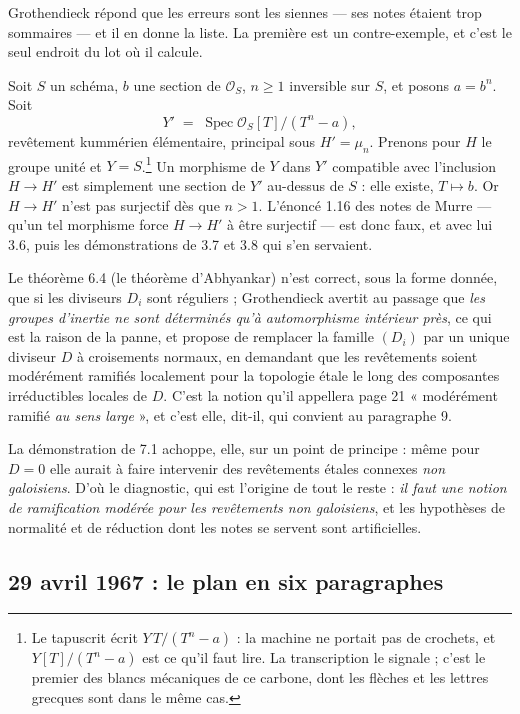 \documentclass[11pt,a4paper]{article}
\begin{document}
Grothendieck répond que les erreurs sont les siennes --- ses notes étaient trop
sommaires --- et il en donne la liste. La première est un contre-exemple, et
c'est le seul endroit du lot où il calcule.

Soit $S$ un schéma, $b$ une section de $\mathcal{O}_{S}$, $n \geqslant 1$
inversible sur $S$, et posons $a = b^{n}$. Soit
\[
  Y' \;=\; \operatorname{Spec} \mathcal{O}_{S}[T]/(T^{n} - a) ,
\]
revêtement kummérien élémentaire, principal sous $H' = \mu_{n}$. Prenons pour
$H$ le groupe unité et $Y = S$.\footnote{Le tapuscrit écrit $Y\,T/(T^{n}-a)$ :
la machine ne portait pas de crochets, et $Y[T]/(T^{n}-a)$ est ce qu'il faut
lire. La transcription le signale ; c'est le premier des blancs mécaniques de
ce carbone, dont les flèches et les lettres grecques sont dans le même cas.}
Un morphisme de $Y$ dans $Y'$ compatible avec l'inclusion $H \to H'$ est
simplement une section de $Y'$ au-dessus de $S$ : elle existe, $T \mapsto b$.
Or $H \to H'$ n'est pas surjectif dès que $n > 1$. L'énoncé 1.16 des notes de
Murre --- qu'un tel morphisme force $H \to H'$ à être surjectif --- est donc
faux, et avec lui 3.6, puis les démonstrations de 3.7 et 3.8 qui s'en
servaient.

Le théorème 6.4 (le théorème d'Abhyankar) n'est correct, sous la forme donnée,
que si les diviseurs $D_{i}$ sont réguliers ; Grothendieck avertit au passage
que \emph{les groupes d'inertie ne sont déterminés qu'à automorphisme intérieur
près}, ce qui est la raison de la panne, et propose de remplacer la famille
$(D_{i})$ par un unique diviseur $D$ à croisements normaux, en demandant que
les revêtements soient modérément ramifiés localement pour la topologie étale
le long des composantes irréductibles locales de $D$. C'est la notion qu'il
appellera page 21 « modérément ramifié \emph{au sens large} », et c'est elle,
dit-il, qui convient au paragraphe 9.

La démonstration de 7.1 achoppe, elle, sur un point de principe : même pour
$D = 0$ elle aurait à faire intervenir des revêtements étales connexes
\emph{non galoisiens}. D'où le diagnostic, qui est l'origine de tout le reste :
\emph{il faut une notion de ramification modérée pour les revêtements non
galoisiens}, et les hypothèses de normalité et de réduction dont les notes se
servent sont artificielles.

\subsection*{29 avril 1967 : le plan en six paragraphes}
\end{document}
